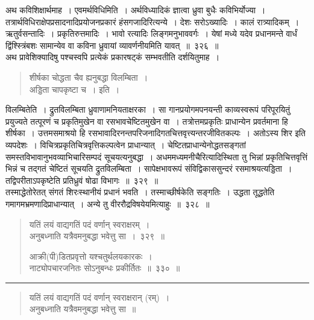 \documentclass[11pt, openany]{book}
\begin{document}
अथ कविशिक्षार्थमाह~। {\qtt एवमर्थविधि}मिति~। {\qtt अर्थविध्यादिकं} ज्ञात्वा ध्रुवा बुधैः कविभिर्योज्या~। तत्रार्थविधिराक्षेपप्रसादनादिप्रयोजनप्रकारं हंसगजादिरित्यन्ये~। देशः सरोऽख्यादिः~। कालं रात्र्यादिकम्~। ऋतुर्वसन्तादिः~। {\qtt प्रकृतिरुत्तमादिः}~। भावो रत्यादिः लिङ्गमनुभाववर्गः~। येषां मध्ये यदेव प्रधानमन्ते वार्धं द्विंश्स्त्रिंबशः सामान्येव वा कविना ध्रुवायां व्यावर्णनीयमिति यावत्~॥~३२६~॥\\

अथ प्रावेशिक्यादिषु पश्चस्वपि प्रत्येकं प्रकारषट्कं सम्भवतीति दर्शयितुमाह~। 

\begin{quote}
{\qt शीर्षका चोद्धता चैव ह्यनुबद्धा विलम्बिता~। \\
 अड्डिता चापकृष्टा च~।} इति~।
\end{quote}

\noindent
{\qtt विलम्बितेति}~। द्रुतविलम्बिता ध्रुवाणामनियताक्षरका~। सा गानप्रयोगमपनयन्ती काव्यस्वरूपं परिपूरयितुं प्रयुज्यते तत्पूरणं च प्रकृतिमुखेन वा रसभावचेष्टितमुखेन वा~। तत्रोत्तमप्रकृतिः प्राधान्येन प्रवर्तमाना हि {\qtt शीर्षका}~। उत्तमसमाश्रयो हि रसभावादिरनन्तपरिजनादिगतचित्तवृत्त्यन्तरजीवितकल्पः~। अतोऽस्य शिर इति व्यपदेशः~। विचित्रप्रकृतिचित्रवृत्तिकल्पत्वेन प्राधान्यात्~। चेष्टितप्राधान्येनोद्धतसङ्गतां समस्तविभावानुभवव्याभिचारिसम्पदं सूचयत्यनुबद्धा~। अधममध्यमनीचैरित्यादिस्थिता तु भिन्नां प्रकृतिचित्तवृत्तिं भिन्नं च तद्गतं चेष्टितं सूचयति {\qtt द्रुतविलम्बिता}~। सापेक्षभावरूपं संविद्विकाससुन्दरं रसमाश्रयत्यड्डिता~। तद्विपरीताऽपकृष्टेति प्रतिध्रुवं {\qtt षोढा} विभागः~॥~३२९~॥\\

तस्माद्धेतोरेतत् संगतं {\qtt शिरःस्थानीयं} प्रधानं भवति~। तस्माच्छीर्षकेति सङ्गतिः~। {\qtt उद्धता तूद्धतेति} गमागमभ्रमणादिप्राधान्यात्~। अन्ये तु वीररौद्रविषयेयमित्याहुः~॥~३२८~॥

\newpage

\begin{quote}
{\na यतिं लयं वाद्यगतिं पदं वर्णान् स्वराक्षरम्~। \\
 अनुबध्नाति यत्रैवमनुबद्धा भवेत्तु सा~।~३२९~॥ 

 आक्री(पी)डितप्रवृत्तो यश्चतुर्थलयकारकः~। \\
 नाट्योपचारजनितः सोऽनुबन्धः प्रकीर्तितः~॥~३३०~॥}
\end{quote}

\hrule

\begin{quote}
{\qt यतिं लयं वाद्यगतिं पदं वर्णान् स्वराक्षरान् (रम्)~। \\
 अनुबध्नाति यत्रैवमनुबद्धा भवेत्तु सा~॥}
\end{quote}
\end{document}

